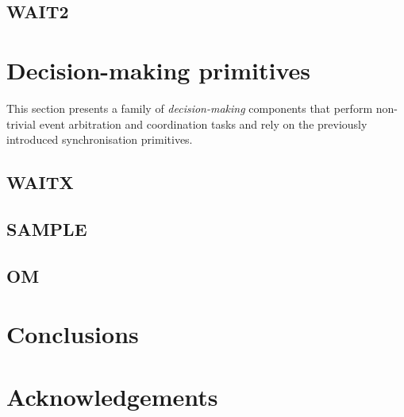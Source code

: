 \documentclass[conference]{IEEEtran}
\begin{document}
\subsection{WAIT2}


\section{Decision-making primitives}

This section presents a family of \emph{decision-making} components that perform
non-trivial event arbitration and coordination tasks and rely on the previously
introduced synchronisation primitives.

\subsection{WAITX}
\subsection{SAMPLE}
\subsection{OM}


\section{Conclusions}

\section*{Acknowledgements}


\end{document}
